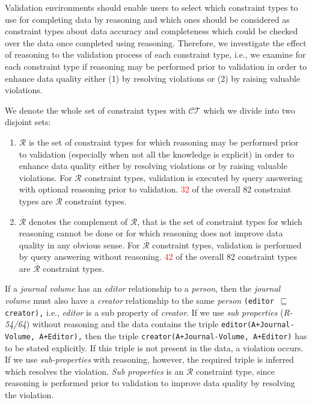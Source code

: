 \documentclass{acm_proc_article-sp}
\newcommand{\ms}[1]{%
  \texttt{#1}
}
\begin{document}
Validation environments should enable users to select which constraint types to use for completing data by reasoning 
and which ones should be considered as constraint types about data accuracy and completeness which could be checked over the data once completed using reasoning.
Therefore, we investigate the effect of reasoning to the validation process of each constraint type, i.e.,
we examine for each constraint type if reasoning may be performed prior to validation in order to enhance data quality
either (1) by resolving violations or (2) by raising valuable violations.

We denote the whole set of constraint types with $\mathcal{CT}$ which we divide into two disjoint sets: 
\begin{enumerate}
\item $\mathcal{R}$ is the set of constraint types for which reasoning may be performed prior to validation (especially when not all the knowledge is explicit) in order to enhance data quality
either by resolving violations or by raising valuable violations.
For $\mathcal{R}$ constraint types, validation is executed by query answering with optional reasoning prior to validation.
\textcolor{red}{32} of the overall 82 constraint types are $\mathcal{R}$ constraint types.
\item $\overline{\mathcal{R}}$  denotes the complement of $\mathcal{R}$, that is the set of constraint types 
for which reasoning cannot be done or for which reasoning does not improve data quality in any obvious sense.
For $\overline{\mathcal{R}}$ constraint types, validation is performed by query answering without reasoning.
\textcolor{red}{42} of the overall 82 constraint types are $\overline{\mathcal{R}}$ constraint types.
\end{enumerate}

If a \emph{journal volume} has an {\em editor} relationship to a \emph{person}, 
then the \emph{journal volume} must also have a {\em creator} relationship to the same \emph{person} {\small\ms{(editor $\sqsubseteq$ creator),}}i.e., 
\emph{editor} is a sub property of \emph{creator}.
If we use \emph{sub properties} (\emph{R-54/64}) without reasoning and the data contains the triple {\small\ms{editor(A+Journal-Volume, A+Editor),}}
then the triple {\small\ms{creator(A+Journal-Volume, A+Editor)}} has to be stated explicitly.
If this triple is not present in the data, a violation occurs.
If we use \emph{sub-properties} with reasoning, however, the required triple is inferred which resolves the violation.
{\em Sub properties} is an $\mathcal{R}$ constraint type, 
since reasoning is performed prior to validation to improve data quality by resolving the violation.
\end{document}
